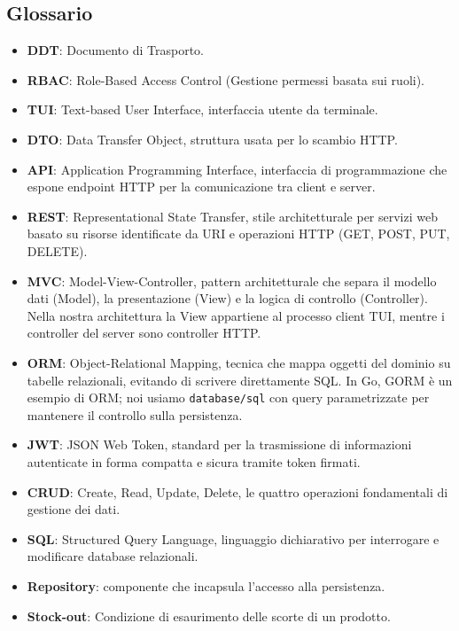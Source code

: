 \documentclass[a4paper,12pt]{article}
\begin{document}
\subsection{Glossario}
\begin{itemize}
    \item \textbf{DDT}: Documento di Trasporto.
    \item \textbf{RBAC}: Role-Based Access Control (Gestione permessi basata sui ruoli).
    \item \textbf{TUI}: Text-based User Interface, interfaccia utente da terminale.
    \item \textbf{DTO}: Data Transfer Object, struttura usata per lo scambio HTTP.
    \item \textbf{API}: Application Programming Interface, interfaccia di programmazione che espone endpoint HTTP per la comunicazione tra client e server.
    \item \textbf{REST}: Representational State Transfer, stile architetturale per servizi web basato su risorse identificate da URI e operazioni HTTP (GET, POST, PUT, DELETE).
    \item \textbf{MVC}: Model-View-Controller, pattern architetturale che separa il modello dati (Model), la presentazione (View) e la logica di controllo (Controller). Nella nostra architettura la View appartiene al processo client TUI, mentre i controller del server sono controller HTTP.
    \item \textbf{ORM}: Object-Relational Mapping, tecnica che mappa oggetti del dominio su tabelle relazionali, evitando di scrivere direttamente SQL. In Go, GORM \`{e} un esempio di ORM; noi usiamo \texttt{database/sql} con query parametrizzate per mantenere il controllo sulla persistenza.
    \item \textbf{JWT}: JSON Web Token, standard per la trasmissione di informazioni autenticate in forma compatta e sicura tramite token firmati.
    \item \textbf{CRUD}: Create, Read, Update, Delete, le quattro operazioni fondamentali di gestione dei dati.
    \item \textbf{SQL}: Structured Query Language, linguaggio dichiarativo per interrogare e modificare database relazionali.
    \item \textbf{Repository}: componente che incapsula l'accesso alla persistenza.
    \item \textbf{Stock-out}: Condizione di esaurimento delle scorte di un prodotto.
\end{itemize}
\end{document}
